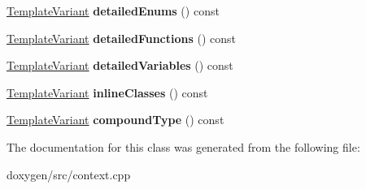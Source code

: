\begin{DoxyCompactItemize}
\mbox{\hyperlink{class_template_variant}{Template\+Variant}} {\bfseries detailed\+Enums} () const
\item 
\mbox{\label{class_file_context_1_1_private_a0dda9c44a1adcaec8299b5ad9e272e8b}} 
\mbox{\hyperlink{class_template_variant}{Template\+Variant}} {\bfseries detailed\+Functions} () const
\item 
\mbox{\label{class_file_context_1_1_private_a2501bc6e029b4e06f6ac8d082465d5a8}} 
\mbox{\hyperlink{class_template_variant}{Template\+Variant}} {\bfseries detailed\+Variables} () const
\item 
\mbox{\label{class_file_context_1_1_private_a78c7d1a80969198d72fa76fb2436d616}} 
\mbox{\hyperlink{class_template_variant}{Template\+Variant}} {\bfseries inline\+Classes} () const
\item 
\mbox{\label{class_file_context_1_1_private_a1ee6226997b4e6614aa4c3775d30c164}} 
\mbox{\hyperlink{class_template_variant}{Template\+Variant}} {\bfseries compound\+Type} () const
\end{DoxyCompactItemize}


The documentation for this class was generated from the following file\+:\begin{DoxyCompactItemize}
\item 
doxygen/src/context.\+cpp\end{DoxyCompactItemize}
